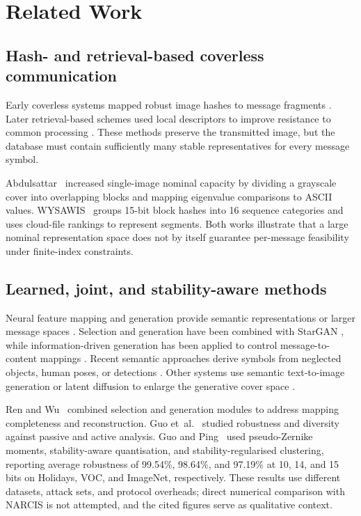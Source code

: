 \documentclass[10pt,journal]{IEEEtran}
\newcommand{\method}{NARCIS\xspace}
\begin{document}
\section{Related Work}
\label{sec:related}

\subsection{Hash- and retrieval-based coverless communication}

Early coverless systems mapped robust image hashes to message fragments
\cite{zhou2015coverless,zheng2017hashing}. Later retrieval-based schemes
used local descriptors to improve resistance to common processing
\cite{li2024surf}. These methods preserve the transmitted image, but
the database must contain sufficiently many stable representatives for
every message symbol.

Abdulsattar~\cite{abdulsattar2021} increased single-image nominal
capacity by dividing a grayscale cover into overlapping blocks and
mapping eigenvalue comparisons to ASCII values. WYSAWIS~\cite{wysawis2025}
groups 15-bit block hashes into 16 sequence categories and uses
cloud-file rankings to represent segments. Both works illustrate that
a large nominal representation space does not by itself guarantee
per-message feasibility under finite-index constraints.

\subsection{Learned, joint, and stability-aware methods}

Neural feature mapping and generation provide semantic representations
or larger message spaces \cite{qin2020gan,meng2024review}. Selection
and generation have been combined with StarGAN \cite{chen2022stargan},
while information-driven generation has been applied to control
message-to-content mappings \cite{zhang2023idgan}. Recent semantic
approaches derive symbols from neglected objects, human poses, or
detections \cite{zou2023neglected,tan2024pose,meng2024object}. Other
systems use semantic text-to-image generation or latent diffusion to
enlarge the generative cover space \cite{li2025semantic,guo2026diffusion}.

Ren and Wu~\cite{ren2024joint} combined selection and generation modules
to address mapping completeness and reconstruction. Guo
et~al.~\cite{guo2025diverse} studied robustness and diversity against
passive and active analysis. Guo and Ping~\cite{guo2026capacity} used
pseudo-Zernike moments, stability-aware quantisation, and
stability-regularised clustering, reporting average robustness of
99.54\%, 98.64\%, and 97.19\% at 10, 14, and 15 bits on Holidays,
VOC, and ImageNet, respectively. These results use different datasets,
attack sets, and protocol overheads; direct numerical comparison
with \method is not attempted, and the cited figures serve as
qualitative context.
\end{document}
